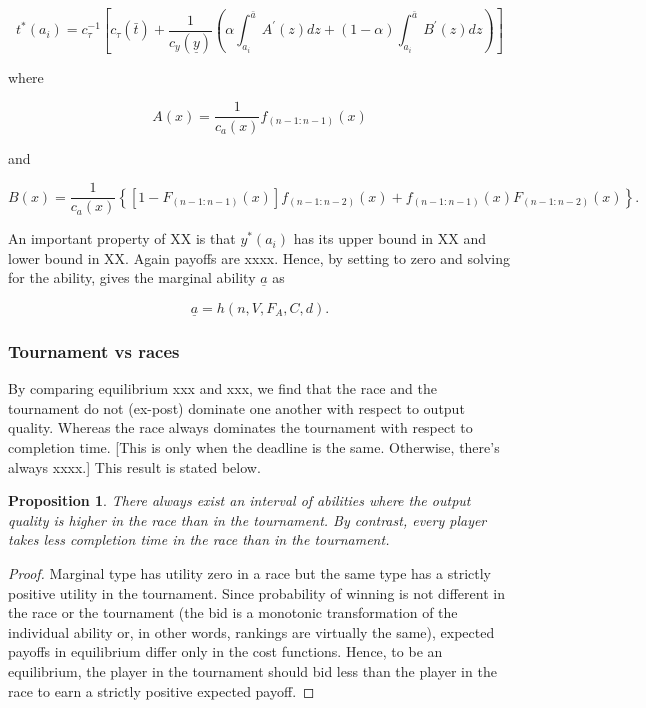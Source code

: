 \documentclass[11pt, titlepage]{article}
\newtheorem{proposition}{Proposition}
\newcommand\deadline{\bar{t}}
\newcommand\target{\underline{y}}
\newcommand\ctime{c_{\tau}}
\newcommand\cscore{c_{y}}
\newcommand\hitype{\bar{a}}
\begin{document}
\begin{equation} \label{tstar}
t^*(a_i) = 
    \ctime^{-1}
    \left[\ctime(\deadline) 
    + \frac{1}{\cscore(\target)}
    \left(\alpha \int_{a_i}^{\hitype} A^\prime(z) dz
      + (1-\alpha) \int_{a_i}^{\hitype} B^\prime(z)  dz
    \right)
    \right]
\end{equation}

where

\begin{equation}
  A(x) = \frac{1}{c_{a}(x)} f_{(n-1:n-1)}(x)
\end{equation}

and

\begin{equation}
    B(x) = \frac{1}{c_{a}(x)} \left\{
            \left[1- F_{(n-1:n-1)}(x)\right]f_{(n-1:n-2)}(x)
            + f_{(n-1:n-1)}(x) F_{(n-1:n-2)}(x)
    \right\}.
\end{equation}

An important property of XX is that \(y^*(a_i)\) has its upper bound in
XX and lower bound in XX. Again payoffs are xxxx. Hence, by setting to
zero and solving for the ability, gives the marginal ability
\({\underline a}\) as

\begin{equation}
  {\underline a}= h(n, V, F_A, C, d).
\end{equation}

\subsubsection{Tournament vs races}\label{tournament-vs-races}

By comparing equilibrium xxx and xxx, we find that the race and the
tournament do not (ex-post) dominate one another with respect to output
quality. Whereas the race always dominates the tournament with respect
to completion time. {[}This is only when the deadline is the same.
Otherwise, there's always xxxx.{]} This result is stated below.

\begin{proposition}
There always exist an interval of abilities where the output quality is higher in the race than in the tournament. By contrast, every player takes less completion time in the race than in the tournament.
\end{proposition}

\begin{proof}
Marginal type has utility zero in a race but the same type has a strictly positive utility in the tournament. Since probability of winning is not different in the race or the tournament (the bid is a monotonic transformation of the individual ability or, in other words, rankings are virtually the same), expected payoffs in equilibrium differ only in the cost functions. Hence, to be an equilibrium, the player in the tournament should bid less than the player in the race to earn a strictly positive expected payoff. 
\end{proof}
\end{document}
